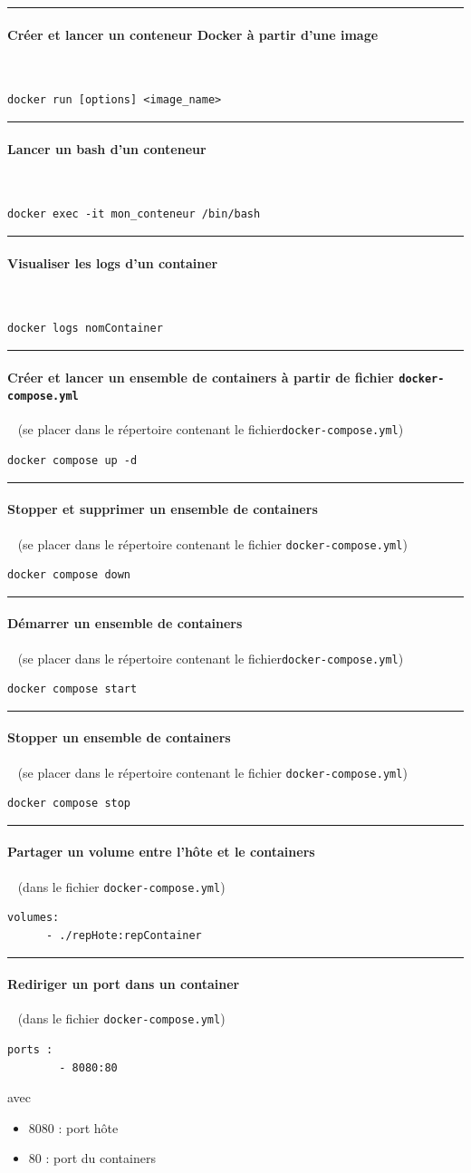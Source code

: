 \documentclass[french, 12pt]{article}%
\newcommand{\itemE}{\item[$\bullet$]}
\newcommand{\paraL}[1]{\tiny\noindent\rule{1.0\linewidth}{0.5pt}\paragraph*{#1}\  \normalsize}
\begin{document}
\paraL{Créer et lancer un conteneur Docker à partir d'une image }

\begin{lstlisting}[style=commande]
docker run [options] <image_name>
\end{lstlisting}



\paraL{Lancer un bash d'un conteneur} 
\begin{lstlisting}[style=commande]
docker exec -it mon_conteneur /bin/bash
\end{lstlisting}



\paraL{Visualiser les logs d'un container} 
\begin{lstlisting}[style=commande]
docker logs nomContainer
\end{lstlisting}

\paraL{Créer et lancer un ensemble de containers à partir de fichier \verb?docker-compose.yml?} (se placer dans le répertoire contenant le fichier\verb?docker-compose.yml?)

\begin{lstlisting}[style=commande]
docker compose up -d
\end{lstlisting}


\paraL{Stopper et supprimer un ensemble de containers} (se placer dans le répertoire contenant le fichier \verb?docker-compose.yml?)
\begin{lstlisting}[style=commande]
docker compose down
\end{lstlisting}

\paraL{Démarrer un ensemble de containers} (se placer dans le répertoire contenant le fichier\verb?docker-compose.yml?)
\begin{lstlisting}[style=commande]
docker compose start
\end{lstlisting}

\paraL{Stopper un ensemble de containers} (se placer dans le répertoire contenant le fichier \verb?docker-compose.yml?)
\begin{lstlisting}[style=commande]
docker compose stop
\end{lstlisting}


\paraL{Partager un volume entre l'hôte et le containers} (dans le fichier \verb?docker-compose.yml?)

\begin{lstlisting}[style=commande]
volumes:
      - ./repHote:repContainer
\end{lstlisting}




\paraL{Rediriger un port dans un container} (dans le fichier \verb?docker-compose.yml?)

\begin{lstlisting}[style=commande]
ports : 
        - 8080:80
\end{lstlisting}
avec 
\begin{itemize}
\itemE 8080 : port hôte
\itemE 80 : port du containers 
\end{itemize}
\end{document}
